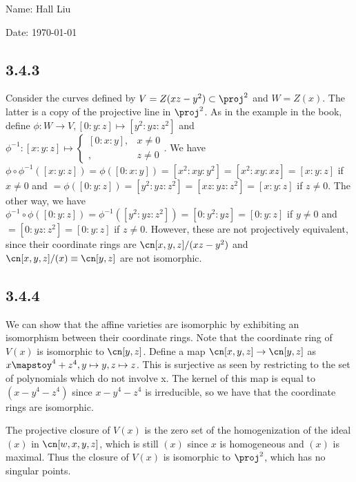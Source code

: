\documentclass{article}
\begin{document}
Name: Hall Liu

Date: \today 
\vspace{1.5cm}

\subsection*{3.4.3}
Consider the curves defined by $V=Z(xz-y^2)\subset\proj^2$ and $W=Z(x)$. The latter is a copy of the projective line in $\proj^2$. As in the example in the book, define $\phi:W\to V, [0:y:z]\mapsto [y^2:yz:z^2]$ and $\phi^{-1}:[x:y:z]\mapsto\begin{cases}[0:x:y],&x\neq0\\[0:y:z],&z\neq0\end{cases}$. We have $\phi\circ\phi^{-1}([x:y:z])=\phi([0:x:y])=[x^2:xy:y^2]=[x^2:xy:xz]=[x:y:z]$ if $x\neq0$ and $=\phi([0:y:z])=[y^2:yz:z^2]=[xz:yz:z^2]=[x:y:z]$ if $z\neq0$. The other way, we have $\phi^{-1}\circ\phi([0:y:z])=\phi^{-1}([y^2:yz:z^2])=[0:y^2:yz]=[0:y:z]$ if $y\neq0$ and $=[0:yz:z^2]=[0:y:z]$ if $z\neq0$. However, these are not projectively equivalent, since their coordinate rings are $\cn[x,y,z]/(xz-y^2)$ and $\cn[x,y,z]/(x)\equiv\cn[y,z]$ are not isomorphic.
\subsection*{3.4.4}
We can show that the affine varieties are isomorphic by exhibiting an isomorphism between their coordinate rings. Note that the coordinate ring of $V(x)$ is isomorphic to $\cn[y,z]$. Define a map $\cn[x,y,z]\to\cn[y,z]$ as $x\mapstoy^4+z^4, y\mapsto y, z\mapsto z$. This is surjective as seen by restricting to the set of polynomials which do not involve x. The kernel of this map is equal to $(x-y^4-z^4)$ since $x-y^4-z^4$ is irreducible, so we have that the coordinate rings are isomorphic.

The projective closure of $V(x)$ is the zero set of the homogenization of the ideal $(x)$ in $\cn[w,x,y,z]$, which is still $(x)$ since $x$ is homogeneous and $(x)$ is maximal. Thus the closure of $V(x)$ is isomorphic to $\proj^2$, which has no singular points. 
\end{document}
